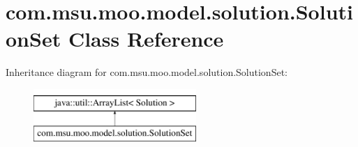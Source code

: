 \hypertarget{classcom_1_1msu_1_1moo_1_1model_1_1solution_1_1SolutionSet}{\section{com.\-msu.\-moo.\-model.\-solution.\-Solution\-Set Class Reference}
\label{classcom_1_1msu_1_1moo_1_1model_1_1solution_1_1SolutionSet}
}
Inheritance diagram for com.\-msu.\-moo.\-model.\-solution.\-Solution\-Set\-:\begin{figure}[H]
\begin{center}
\leavevmode
\includegraphics[height=2.000000cm]{classcom_1_1msu_1_1moo_1_1model_1_1solution_1_1SolutionSet}
\end{center}
\end{figure}
